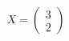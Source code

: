 \documentclass[preview]{standalone}
\begin{document}
\begin{align*}
X = \begin{pmatrix} 3 \\ 2 \end{pmatrix}
\end{align*}
\end{document}
